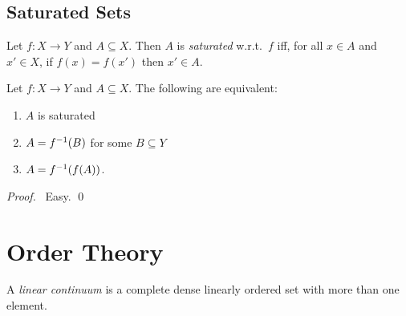 \section{Saturated Sets}

\begin{df}
  Let $f : X \rightarrow Y$ and $A \subseteq X$. Then $A$ is \emph{saturated} w.r.t.~$f$ iff, for all $x \in A$ and $x' \in X$, if $f(x) = f(x')$ then $x' \in A$.
\end{df}

\begin{prop}
  Let $f : X \rightarrow Y$ and $A \subseteq X$. The following are equivalent:
  \begin{enumerate}
    \item $A$ is saturated
    \item $A = {f}^{-1}(B)$ for some $B \subseteq Y$
    \item $A = {f}^{-1}(f(A))$.
  \end{enumerate}
\end{prop}

\begin{proof}
  \pf\ Easy. \qed
\end{proof}

\chapter{Order Theory}

\begin{df}
  A \emph{linear continuum} is a complete dense linearly ordered set with more than one element.
\end{df}
